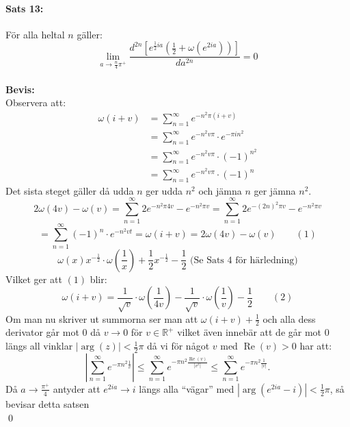 \documentclass{article}%
\begin{document}
\paragraph{Sats 13:} För alla heltal $n$ gäller:
\[%
	\lim_{a \to \frac n 4 \pi^+} \frac {
		d^{2n} [
			e^{\frac 1 2 ia} (\frac 1 2 + \omega(e^{2ia}))
		]}
		{
			da^{2n}
		} = 0
\]
\\
{\bf Bevis:}\\
Observera att:
\begin{align*}
	\omega(i + v) &= \sum_{n = 1}^\infty e^{-n^2 \pi(i + v)} \\
		&= \sum_{n = 1}^\infty e^{-n^2 v \pi} \cdot e^{-\pi i n^2} \\
		&= \sum_{n = 1}^\infty e^{-n^2 v \pi} \cdot (- 1)^{n^2} \\
		&= \sum_{n = 1}^\infty e^{-n^2 v \pi} \cdot (- 1)^n
\end{align*}
Det sista steget gäller då udda $n$ ger udda $n^2$ och jämna $n$ ger jämna $n^2$.
\[
	2 \omega(4v) - \omega(v) = \sum_{n = 1}^\infty 2 e^{-n^2 \pi 4 v} - e^{-n^2 \pi v} = \sum_{n = 1}^\infty 2
		e^{-(2n)^2\pi v} - e^{-n^2 \pi v} 
\]
\[
	= \sum_{n = 1}^\infty (-1)^n \cdot e^{-n^2 vt} = \omega(i + v) = 2 \omega(4 v) -
			\omega(v) \qquad (1)
\]
\[
	\omega(x) x^{- \frac 1 2} \cdot \omega(\frac 1 x) + \frac 1 2  x^{- \frac 1 2} - \frac 1 2 \text{ (Se Sats 4 för härledning)}
\]
Vilket ger att $(1)$ blir:
\[
	\omega(i + v) = \frac {1} {\sqrt v} \cdot \omega(\frac {1} {4v}) - \frac {1} {\sqrt v} \cdot \omega(\frac 1 v) - \frac 1 2
		\qquad (2)
\]
Om man nu skriver ut summorna ser man att $\omega(i + v) + \frac 1 2$ och alla dess derivator går
mot $0$ då $v \to 0$ för $v \in \mathbb{R}^+$
vilket även innebär att de går mot $0$ längs all vinklar $|\operatorname{arg}(z)| < \frac 1 2 \pi$ då vi för något $v$ med 
$\operatorname{Re}(v) > 0$ har att:
\[
	\left |
		 \sum_{n = 1}^\infty e^{-\pi n^2 \frac 1 v} 
	\right | \leq 
		\sum_{n = 1}^\infty e^{-\pi n^2 \frac {\operatorname{Re}(v)} {|v^2|}}
	\leq
		\sum_{n = 1}^\infty e^{-\pi n^2 \frac {1} {|v|}}.
\]
Då $a \to \frac {\pi^+} {4}$ antyder att $e^{2ia} \to i$ längs alla ``vägar''
med $|\operatorname{arg}(e^{2ia} - i) | < \frac 1 2 \pi$, så bevisar detta satsen\\
\hfill \qed
\end{document}
